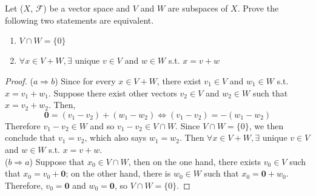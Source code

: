 \documentclass{article}
\theoremstyle{definition} %
\begin{document}
\section{}

Let ($X$, $\mathcal F$) be a vector space and $V$ and $W$ are subspaces of $X$. Prove the following two statements are equivalent.

\begin{enumerate}[label=(\alph*)]
    \item $V \cap W = \{0\}$
    \item $\forall x\in V+W, \exists$ unique $v\in V$ and $ w\in W$ s.t. $x = v+w$ 
\end{enumerate}

\begin{proof}
    ($a \Rightarrow b$) Since for every $x\in V+W$, there exist $v_1\in V$ and $ w_1\in W$ s.t. $x = v_1 + w_1$. Suppose there exist other vectors $v_2 \in V$ and $w_2 \in W$ such that $x = v_2 + w_2$. Then,
    $$\mathbf 0 = (v_1 - v_2) + (w_1 - w_2) \Leftrightarrow (v_1 - v_2) = - (w_1 - w_2)$$
    Therefore $v_1 - v_2 \in W$ and so $v_1 - v_2 \in V\cap W$. Since $V\cap W = \{0\}$, we then conclude that $v_1 = v_2$, which also says $w_1 = w_2$. Then $\forall x\in V+W, \exists$ unique $v\in V$ and $ w\in W$ s.t. $x = v+w$.\\
    ($b \Rightarrow a$) Suppose that $x_0 \in V\cap W$, then on the one hand, there exists $v_0\in V$ such that $x_0 = v_0 + \mathbf 0$; on the other hand, there is $w_0 \in W$ such that $x_0 = \mathbf 0 + w_0$. Therefore, $v_0 = \mathbf 0$ and $w_0 = \mathbf 0$, so $V \cap W = \{0\}$.
\end{proof}
\end{document}
